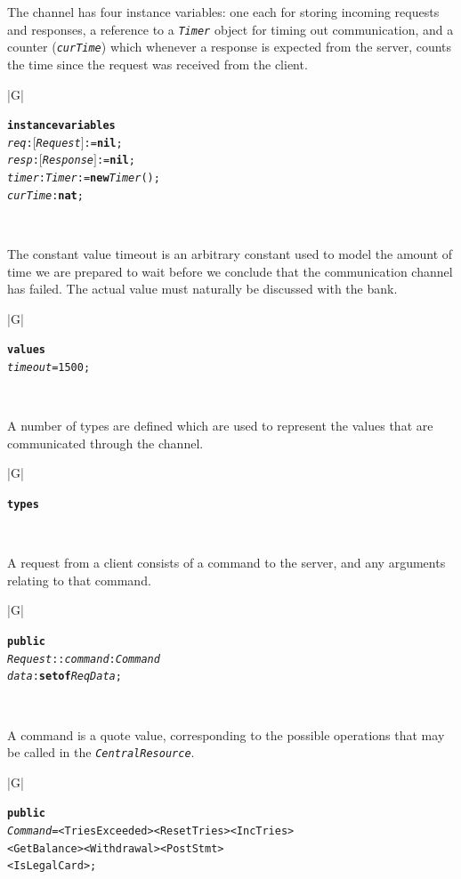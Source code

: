 \documentclass[\pformat,12pt,twoside]{article}
\newenvironment{VDMgray}%
{\begin{tabular}{|G|}\hline\small\begin{alltt}}%
{\end{alltt}\normalsize\\
 \hline\end{tabular}}
\begin{document}
The channel has four instance variables: one each for storing 
incoming requests and responses, a reference to a \texttt{\emph{Timer}} object 
for timing out communication, and a counter (\texttt{\emph{curTime}}) which 
whenever a response is expected from the server, counts the time 
since the request was received from the client.

\begin{VDMgray}
\textbf{instance} \textbf{variables}
 \textit{req} : \ensuremath{[}\textit{Request}\ensuremath{]} := \textbf{nil};
 \textit{resp} :\ensuremath{[}\textit{Response}\ensuremath{]} := \textbf{nil};
 \textit{timer} : \textit{Timer} := \textbf{new} \textit{Timer}();
 \textit{curTime} : \textbf{nat};
\end{VDMgray}


The constant value timeout is an arbitrary constant used to model 
the amount of time we are prepared to wait before we conclude 
that the communication channel has failed. The actual value must
naturally be discussed with the bank.

\begin{VDMgray}
\textbf{values}
 \textit{timeout} = 1500;
\end{VDMgray}


A number of types are defined which are used to represent the 
values that are communicated through the channel.

\begin{VDMgray}
\textbf{types}
\end{VDMgray}


A request from a client consists of a command to the server, 
and any arguments relating to that command.

\begin{VDMgray}
 \textbf{public}
 \textit{Request} :: \textit{command} : \textit{Command}
            \textit{data} : \textbf{set} \textbf{of} \textit{ReqData};
\end{VDMgray}


A command is a quote value, corresponding to the possible operations 
that may be called in the  \texttt{\emph{CentralResource}}.

\begin{VDMgray}
 \textbf{public}
 \textit{Command} = \texttt{<}TriesExceeded\texttt{>} {\textbar} \texttt{<}ResetTries\texttt{>} {\textbar} \texttt{<}IncTries\texttt{>} {\textbar}
           \texttt{<}GetBalance\texttt{>} {\textbar} \texttt{<}Withdrawal\texttt{>} {\textbar} \texttt{<}PostStmt\texttt{>} {\textbar}
           \texttt{<}IsLegalCard\texttt{>};
\end{VDMgray}
\end{document}
